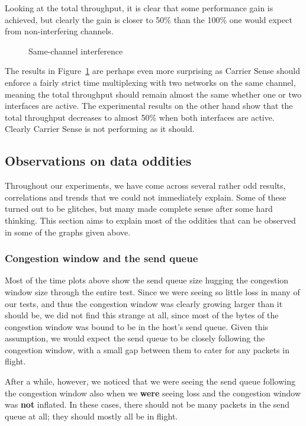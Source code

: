 \documentclass[12pt,a4paper]{article}
\begin{document}
Looking at the total throughput, it is clear that some performance gain is
achieved, but clearly the gain is closer to 50\% than the 100\% one would expect
from non-interfering channels.

\begin{figure}[h]
 \centering
 
 \caption{Same-channel interference}\label{graph:sc-interference}
\end{figure}

The results in Figure~\ref{graph:sc-interference} are perhaps even more
surprising as Carrier Sense should enforce a fairly strict time multiplexing
with two networks on the same channel, meaning the total throughput should
remain almost the same whether one or two interfaces are active. The
experimental results on the other hand show that the total throughput decreases
to almost 50\% when both interfaces are active. Clearly Carrier Sense is not
performing as it should.

\subsection{Observations on data oddities}
Throughout our experiments, we have come across several rather odd results,
correlations and trends that we could not immediately explain. Some of these
turned out to be glitches, but many made complete sense after some hard
thinking. This section aims to explain most of the oddities that can be observed
in some of the graphs given above.

\subsubsection{Congestion window and the send queue}
Most of the time plots above show the send queue size hugging the congestion
window size through the entire test. Since we were seeing so little loss in many
of our tests, and thus the congestion window was clearly growing larger than it
should be, we did not find this strange at all, since most of the bytes
of the congestion window was bound to be in the host's send queue. Given this
assumption, we would expect the send queue to be closely following the
congestion window, with a small gap between them to cater for any packets in
flight.

After a while, however, we noticed that we were seeing the send queue following
the congestion window also when we \textbf{were} seeing loss and the congestion
window was \textbf{not} inflated. In these cases, there should not be many
packets in the send queue at all; they should mostly all be in flight.
\end{document}
